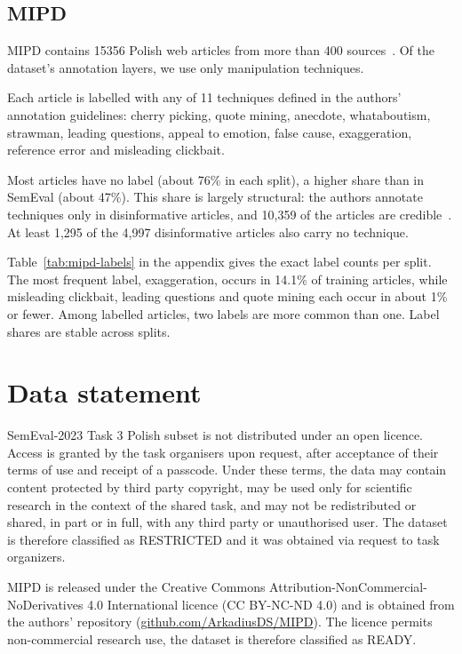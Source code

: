 \documentclass[11pt]{article}
\begin{document}
\subsection{MIPD}

MIPD contains 15356 Polish web articles from more than 400 sources~\cite{mipd-2024}. Of the dataset's annotation layers, we use only manipulation techniques.

Each article is labelled with any of 11 techniques defined in the authors' annotation guidelines: cherry picking, quote mining, anecdote, whataboutism, strawman, leading questions, appeal to emotion, false cause, exaggeration, reference error and misleading clickbait.

Most articles have no label (about 76\% in each split), a higher share than in SemEval (about 47\%). This share is largely structural: the authors annotate techniques only in disinformative articles, and 10,359 of the articles are credible~\cite{mipd-2024}. At least 1,295 of the 4,997 disinformative articles also carry no technique.

Table~\ref{tab:mipd-labels} in the appendix gives the exact label counts per split. The most frequent label, exaggeration, occurs in 14.1\% of training articles, while misleading clickbait, leading questions and quote mining each occur in about 1\% or fewer. Among labelled articles, two labels are more common than one. Label shares are stable across splits.

\section{Data statement}
SemEval-2023 Task 3 Polish subset is not distributed under an open licence. Access is granted by the task organisers upon request, after acceptance of their terms of use and receipt of a passcode. Under these terms, the data may contain content protected by third party copyright, may be used only for scientific research in the context of the shared task, and may not be redistributed or shared, in part or in full, with any third party or unauthorised user. The dataset is therefore classified as RESTRICTED and it was obtained via request to task organizers.

MIPD is released under the Creative Commons Attribution-NonCommercial-NoDerivatives 4.0 International licence (CC BY-NC-ND 4.0) and is obtained from the authors' repository (\url{github.com/ArkadiusDS/MIPD}). The licence permits non-commercial research use, the dataset is therefore classified as READY.
\end{document}
